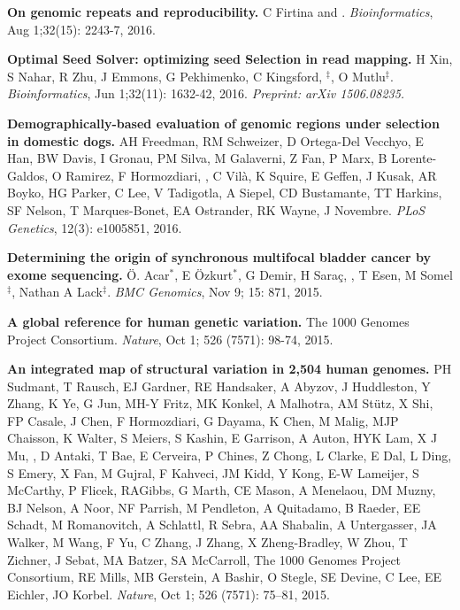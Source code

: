   \vspace{-.2cm}        
  {\bf On genomic repeats and reproducibility.}
  C Firtina and \calkan{}.
 {\em Bioinformatics}, Aug 1;32(15): 2243-7, 2016.

  \vspace{-.2cm}        
  {\bf Optimal Seed Solver: optimizing seed Selection in read mapping.}
  H Xin, S Nahar, R Zhu, J Emmons, G Pekhimenko, C Kingsford, \calkan{}$^\ddag$, O Mutlu$^\ddag$.
 {\em Bioinformatics}, Jun 1;32(11): 1632-42, 2016. \textit{Preprint: arXiv 1506.08235.}

  \vspace{-.2cm}        
  {\bf Demographically-based evaluation of genomic regions under selection in domestic dogs.}
AH Freedman, RM Schweizer, D Ortega-Del Vecchyo, E Han, BW Davis, I Gronau, PM Silva, M Galaverni, Z Fan, P Marx, B Lorente-Galdos, O Ramirez, F Hormozdiari, \calkan{}, C Vilà, K Squire, 
E Geffen, J Kusak, AR Boyko, HG Parker, C Lee, V Tadigotla, A Siepel, CD Bustamante, TT Harkins, SF Nelson, T Marques-Bonet, EA Ostrander, RK Wayne, J Novembre.
 {\em PLoS Genetics}, 12(3): e1005851, 2016.

  \vspace{-.2cm}        
  {\bf Determining the origin of synchronous multifocal bladder cancer by exome sequencing.} 
  Ö. Acar$^*$, E Özkurt$^*$, G Demir, H Saraç, \calkan{}, T Esen, M Somel$^\ddag$, Nathan A Lack$^\ddag$.
 {\em BMC Genomics}, Nov 9; 15: 871, 2015.

  \vspace{-.2cm}        
  {\bf A global reference for human genetic variation.} The 1000 Genomes Project Consortium.  {\em Nature}, Oct 1; 526 (7571): 98-74, 2015.

  \vspace{-.2cm}        
  {\bf An integrated map of structural variation in 2,504 human genomes.}
  PH Sudmant, T Rausch, EJ Gardner,  RE Handsaker, A Abyzov, J Huddleston, Y Zhang, K Ye, G Jun, MH-Y Fritz, MK Konkel, A Malhotra, AM Stütz, X Shi, FP Casale, J Chen, 
  F Hormozdiari, G Dayama, K Chen, M Malig, MJP Chaisson, K Walter, S Meiers, S Kashin, E Garrison, A Auton, HYK Lam, X J Mu, \calkan, D Antaki, T Bae, E Cerveira, P Chines, Z Chong, 
  L Clarke, E Dal, L Ding, S Emery, X Fan, M Gujral, F Kahveci, JM Kidd, Y Kong, E-W Lameijer, S McCarthy, P Flicek, RAGibbs, G Marth, CE Mason, A Menelaou, DM Muzny, 
  BJ Nelson, A Noor, NF Parrish, M Pendleton, A Quitadamo, B Raeder, EE Schadt, M Romanovitch, A Schlattl, R Sebra, AA Shabalin, A Untergasser, 
  JA Walker, M Wang, F Yu, C Zhang, J Zhang, X Zheng-Bradley, W Zhou, T Zichner, J Sebat, MA Batzer, SA McCarroll, 
  The 1000 Genomes Project Consortium, RE Mills, MB Gerstein, A Bashir, O Stegle, SE Devine, C Lee, EE Eichler, JO Korbel. 
  {\em Nature}, Oct 1; 526 (7571): 75–81, 2015.


